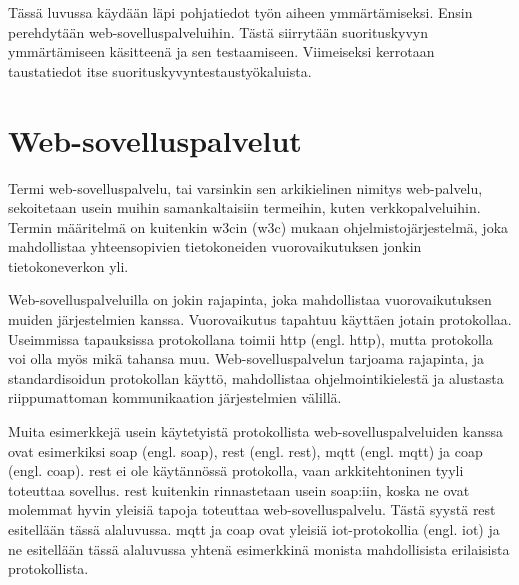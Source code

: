 Tässä luvussa käydään läpi pohjatiedot työn aiheen ymmärtämiseksi. Ensin perehdytään web-sovelluspalveluihin. Tästä siirrytään suorituskyvyn ymmärtämiseen käsitteenä ja sen testaamiseen. Viimeiseksi kerrotaan taustatiedot itse suorituskyvyntestaustyökaluista.

\section{Web-sovelluspalvelut}
\label{sec:web-sovelluspalvelut}
Termi web-sovelluspalvelu, tai varsinkin sen arkikielinen nimitys web-palvelu, sekoitetaan usein muihin samankaltaisiin termeihin, kuten verkkopalveluihin. Termin määritelmä on kuitenkin \acrlong{w3c}in (\acrshort{w3c}) mukaan ohjelmistojärjestelmä, joka mahdollistaa yhteensopivien tietokoneiden vuorovaikutuksen jonkin tietokoneverkon yli. \parencite{w3c}

Web-sovelluspalveluilla on jokin rajapinta, joka mahdollistaa vuorovaikutuksen muiden järjestelmien kanssa. Vuorovaikutus tapahtuu käyttäen jotain protokollaa. Useimmissa tapauksissa protokollana toimii \acrshort{http} (engl. \acrlong{http}), mutta protokolla voi olla myös mikä tahansa muu. \parencite{w3c} Web-sovelluspalvelun tarjoama rajapinta, ja standardisoidun protokollan käyttö, mahdollistaa ohjelmointikielestä ja alustasta riippumattoman kommunikaation järjestelmien välillä. 

Muita esimerkkejä usein käytetyistä protokollista web-sovelluspalveluiden kanssa ovat esimerkiksi \acrshort{soap} (engl. \acrlong{soap}), \acrshort{rest} (engl. \acrlong{rest}), \acrshort{mqtt} (engl. \acrlong{mqtt}) ja \acrshort{coap} (engl. \acrlong{coap}). \acrshort{rest} ei ole käytännössä protokolla, vaan arkkitehtoninen tyyli toteuttaa sovellus. \acrshort{rest} kuitenkin rinnastetaan usein \acrshort{soap}:iin, koska ne ovat molemmat hyvin yleisiä tapoja toteuttaa web-sovelluspalvelu. Tästä syystä \acrshort{rest} esitellään tässä alaluvussa. \acrshort{mqtt} ja \acrshort{coap} ovat yleisiä \acrshort{iot}-protokollia (engl. \acrlong{iot}) ja ne esitellään tässä alaluvussa yhtenä esimerkkinä monista mahdollisista erilaisista protokollista.

